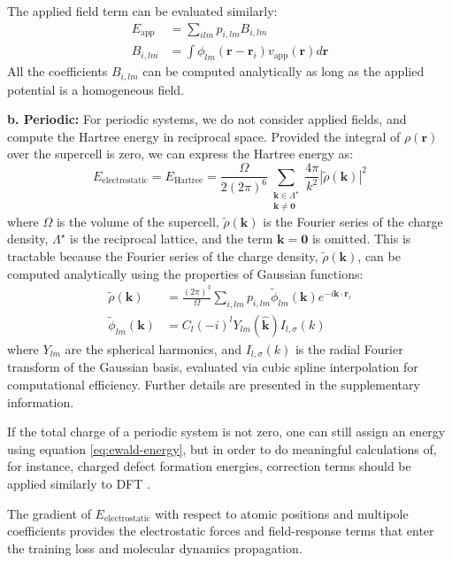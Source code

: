\documentclass[aps,%
superscriptaddress,
 amsmath,amssymb,
floatfix,
twocolumn
]{revtex4-2}
\begin{document}
The applied field term can be evaluated similarly:
\begin{align}
    E_\text{app} &= \sum_{ilm} p_{i,lm} B_{i,lm} \\
    B_{i,lm} &= \int \phi_{lm}(\mathbf{r}-\mathbf{r}_i) v_\text{app}(\mathbf{r}) d\mathbf{r}
\end{align}
All the coefficients $B_{i,lm}$ can be computed analytically as long as the applied potential is a homogeneous field.




\textbf{b. Periodic:} For periodic systems, we do not consider applied fields, and compute the Hartree energy in reciprocal space. Provided the integral of $\rho(\mathbf{r})$ over the supercell is zero, we can express the Hartree energy as:
\begin{equation}
E_{\text{electrostatic}} = E_{\text{Hartree}} = \frac{\Omega}{2(2\pi)^6} \sum_{\substack{\mathbf{k} \in \Lambda^\star\\\mathbf{k}\neq\mathbf{0}}} \frac{4\pi}{k^2} |\tilde{\rho}(\mathbf{k})|^2
\label{eq:ewald-energy}
\end{equation}
where $\Omega$ is the volume of the supercell, $\tilde\rho(\mathbf{k})$ is the Fourier series of the charge density, $\Lambda^\star$ is the reciprocal lattice, and the term $\mathbf{k}=\mathbf{0}$ is omitted. This is tractable because the Fourier series of the charge density, $\tilde{\rho}(\mathbf{k})$, can be computed analytically using the properties of Gaussian functions:
\begin{align}
\tilde{\rho}(\mathbf{k}) &= \frac{(2\pi)^3}{\Omega} \sum_{i,lm} p_{i,lm} \tilde{\phi}_{lm}(\mathbf{k}) e^{-i\mathbf{k}\cdot\mathbf{r}_i} \\
\tilde{\phi}_{lm}(\mathbf{k}) &= C_l (-i)^l Y_{lm}(\hat{\mathbf{k}}) I_{l,\sigma}(k)
\label{eq:fourier-basis}
\end{align}
where $Y_{lm}$ are the spherical harmonics, and $I_{l,\sigma}(k)$ is the radial Fourier transform of the Gaussian basis, evaluated via cubic spline interpolation for computational efficiency. Further details are presented in the supplementary information.

If the total charge of a periodic system is not zero, one can still assign an energy using equation \eqref{eq:ewald-energy}, but in order to do meaningful calculations of, for instance, charged defect formation energies, correction terms should be applied similarly to DFT \cite{MakovPayneChargedCellCorrections}.

The gradient of $E_{\text{electrostatic}}$ with respect to atomic positions and multipole coefficients provides the electrostatic forces and field-response terms that enter the training loss and molecular dynamics propagation.
\end{document}
